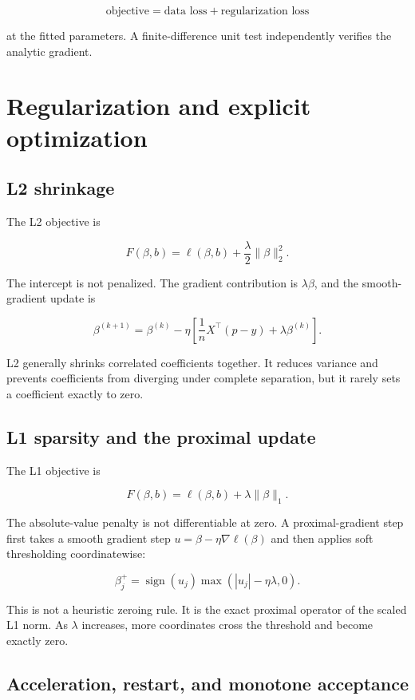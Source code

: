 \documentclass[11pt]{article}
\begin{document}
\[
 \text{objective}=\text{data loss}+\text{regularization loss}
\]

at the fitted parameters. A finite-difference unit test independently verifies
the analytic gradient.

\section{Regularization and explicit optimization}

\subsection{L2 shrinkage}

The L2 objective is

\[
 F(\beta,b)=\ell(\beta,b)+\frac{\lambda}{2}\lVert\beta\rVert_2^2.
\]

The intercept is not penalized. The gradient contribution is $\lambda\beta$,
and the smooth-gradient update is

\[
 \beta^{(k+1)}=\beta^{(k)}-\eta\left[\frac1nX^\top(p-y)+\lambda\beta^{(k)}\right].
\]

L2 generally shrinks correlated coefficients together. It reduces variance and
prevents coefficients from diverging under complete separation, but it rarely
sets a coefficient exactly to zero.

\subsection{L1 sparsity and the proximal update}

The L1 objective is

\[
 F(\beta,b)=\ell(\beta,b)+\lambda\lVert\beta\rVert_1.
\]

The absolute-value penalty is not differentiable at zero. A proximal-gradient
step first takes a smooth gradient step $u=\beta-\eta\nabla\ell(\beta)$ and then
applies soft thresholding coordinatewise:

\[
 \beta_j^+=\operatorname{sign}(u_j)\max(|u_j|-\eta\lambda,0).
\]

This is not a heuristic zeroing rule. It is the exact proximal operator of the
scaled L1 norm. As $\lambda$ increases, more coordinates cross the threshold and
become exactly zero.

\subsection{Acceleration, restart, and monotone acceptance}
\end{document}
